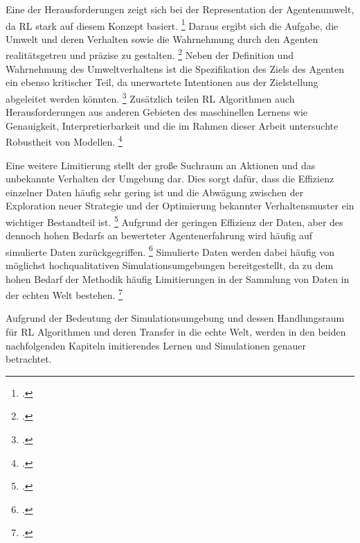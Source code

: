 Eine der Herausforderungen zeigt sich bei der Representation der Agentenumwelt, da RL stark auf diesem Konzept basiert. \footcite[Vgl.][S. 8]{Sutton.2018}
Daraus ergibt sich die Aufgabe, die Umwelt und deren Verhalten sowie die Wahrnehmung durch den Agenten realitätsgetreu und präzise zu gestalten. \footcite[Vgl.][S. 7]{Sutton.2018}
Neben der Definition und Wahrnehmung des Umweltverhaltens ist die Spezifikation des Ziels des Agenten ein ebenso kritischer Teil, da unerwartete Intentionen aus der Zielstellung abgeleitet werden könnten. \footcite[Vgl.][S. 7]{Li.2019}
Zusätzlich teilen RL Algorithmen auch Herausforderungen aus anderen Gebieten des maschinellen Lernens wie Genauigkeit, Interpretierbarkeit und die im Rahmen dieser Arbeit untersuchte Robustheit von Modellen. \footcite[Vgl.][S. 7]{Li.2019}

Eine weitere Limitierung stellt der große Suchraum an Aktionen und das unbekannte Verhalten der Umgebung dar.
Dies sorgt dafür, dass die Effizienz einzelner Daten häufig sehr gering ist und die Abwägung zwischen der Exploration neuer Strategie und der Optimierung bekannter Verhaltensmuster ein wichtiger Bestandteil ist. \footcite[Vgl.][S. 7]{Li.2019}
Aufgrund der geringen Effizienz der Daten, aber des dennoch hohen Bedarfs an bewerteter Agentenerfahrung wird häufig auf simulierte Daten zurückgegriffen. \footcite[Vgl.][S. 7]{Zhao.2020}
Simulierte Daten werden dabei häufig von möglichst hochqualitativen Simulationsumgebungen bereitgestellt, da zu dem hohen Bedarf der Methodik häufig Limitierungen in der Sammlung von Daten in der echten Welt bestehen. \footcite[Vgl.][S. 8]{Li.2019}

Aufgrund der Bedeutung der Simulationsumgebung und dessen Handlungsraum für RL Algorithmen und deren Transfer in die echte Welt, werden in den beiden nachfolgenden Kapiteln imitierendes Lernen und Simulationen genauer betrachtet.